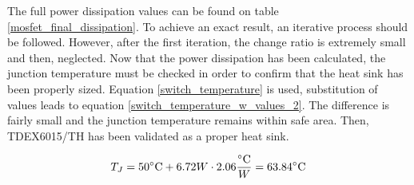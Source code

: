 The full power dissipation values can be found on table \ref{mosfet_final_dissipation}. To achieve an exact result, an iterative process should be followed. However, after the first iteration, the change ratio is extremely small and then, neglected. Now that the power dissipation has been calculated, the junction temperature must be checked in order to confirm that the heat sink has been properly sized. Equation \ref{switch_temperature} is used, substitution of values leads to equation \ref{switch_temperature_w_values_2}. The difference is fairly small and the junction temperature remains within safe area. Then, TDEX6015/TH has been validated as a proper heat sink.

\begin{equation} \label{switch_temperature_w_values_2}
T_{J} = 50 \decC + 6.72 W \cdot  2.06 \frac{\decC}{W} = 63.84 \decC
\end{equation}